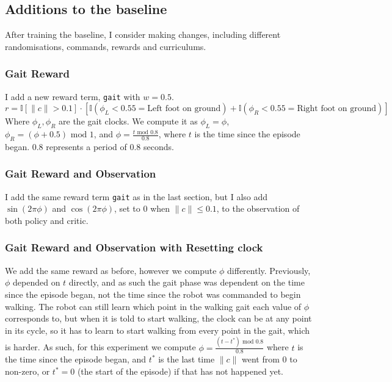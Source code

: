 \documentclass[11pt]{article}
\newcommand{\code}[1]{%
    \colorbox{mdBg}{\textcolor{mdText}{\texttt{#1}}}%
}
\begin{document}
\subsection {Additions to the baseline}
After training the baseline, I consider making changes, including different randomisations, commands, rewards and curriculums.
\subsubsection{Gait Reward}
I add a new reward term, \code{gait} with $w=0.5$.
\[
r=\mathbb{I}[\|c\| > 0.1] \cdot [\mathbb{I}(\phi_L < 0.55 = \text{Left foot on ground}) + \mathbb{I}(\phi_R < 0.55 = \text{Right foot on ground})]
\]
Where $\phi_L,\phi_R$ are the gait clocks. We compute it as $\phi_L = \phi$, $\phi_R = (\phi + 0.5) \text{ mod } 1$, and $\phi = \frac {t \text{ mod } 0.8}{0.8}$, where $t$ is the time since the episode began. 0.8 represents a period of 0.8 seconds.
\subsubsection{Gait Reward and Observation}
I add the same reward term \code{gait} as in the last section, but I also add $\sin(2\pi\phi)$ and $\cos(2\pi\phi)$, set to 0 when $\|c\| \leq 0.1$, to the observation of both policy and critic.
\subsubsection{Gait Reward and Observation with Resetting clock}\label{sec:resetting-clock}
We add the same reward as before, however we compute $\phi$ differently. Previously, $\phi$ depended on $t$ directly, and as such the gait phase was dependent on the time since the episode began, not the time since the robot was commanded to begin walking. The robot can still learn which point in the walking gait each value of $\phi$ corresponds to, but when it is told to start walking, the clock can be at any point in its cycle, so it has to learn to start walking from every point in the gait, which is harder. As such, for this experiment we compute $\phi = \frac {(t-t^*) \text{ mod } 0.8}{0.8}$ where $t$ is the time since the episode began, and $t^*$ is the last time $\|c\|$ went from 0 to non-zero, or $t^*=0$ (the start of the episode) if that has not happened yet.
\end{document}
